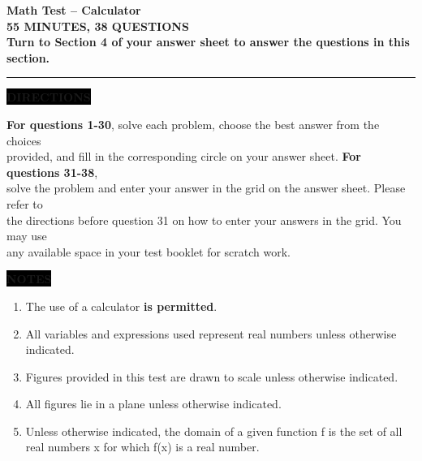 
{\selectfont
\enlargethispage{2cm}

\hspace*{25mm}
\parbox{14cm}{%
{\huge \textbf{Math Test -- Calculator}}\\

{\Large \textbf{55 MINUTES, 38 QUESTIONS}} \\[3mm]


\textbf{Turn to Section 4 of your answer sheet to answer the questions in this section.}\\[2mm]
%
}
\hrule height 1pt

\vspace*{5mm}


\hspace*{25mm}
\parbox{14cm}{%
\raggedright
\colorbox{black}{\color{white}\textbf{\small DIRECTIONS}}\hskip-2pt

\vspace*{5mm}

\textbf{For questions 1-30}, solve each problem, choose the best answer from the choices\\
provided, and fill in the corresponding circle on your answer sheet. \textbf{For questions 31-38},\\
solve the problem and enter your answer in the grid on the answer sheet. Please refer to\\
the directions before question 31 on how to enter your answers in the grid. You may use\\
any available space in your test booklet for scratch work.
}

\vspace*{3mm}


\hspace*{25mm}
\parbox{15cm}{%
\raggedright
\colorbox{black}{\color{white}\textbf{\small NOTES}}\hskip-2pt

\vspace*{0mm}

\begin{enumerate}[itemsep=0mm,leftmargin=5mm]
	\item The use of a calculator \textbf{is permitted}.
	\item All variables and expressions used represent real numbers unless otherwise indicated.
	\item Figures provided in this test are drawn to scale unless otherwise indicated.
	\item All figures lie in a plane unless otherwise indicated.
	\item Unless otherwise indicated, the domain of a given function f is the set of all real numbers x for which f(x) is a real number.
\end{enumerate}	
	}

}

